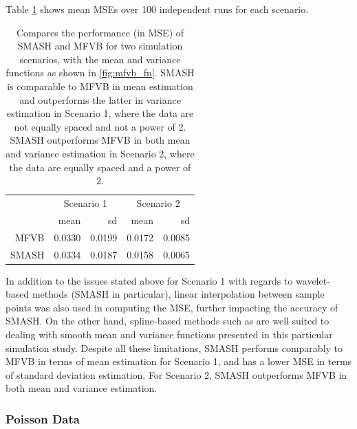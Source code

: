 \documentclass[12pt]{article}
\begin{document}
Table \ref{table:mfvb_comp} shows mean MSEs over 100 independent runs for each scenario.
\begin{table}[ht]
\centering
\begin{tabular}{rrrrr}
\hline
& \multicolumn{2}{c}{Scenario 1}&\multicolumn{2}{c}{Scenario 2}\\
\cline{2-5}
& mean & sd & mean & sd \\
\hline
MFVB & 0.0330 & 0.0199 & 0.0172 & 0.0085 \\
SMASH & 0.0334 & 0.0187 & 0.0158 & 0.0065 \\
\hline
\end{tabular}
\caption{Compares the performance (in MSE) of SMASH and MFVB for two simulation scenarios, with the mean and variance functions as shown in \ref{fig:mfvb_fn}. SMASH is comparable to MFVB in mean estimation and outperforms the latter in variance estimation in Scenario 1, where the data are not equally spaced and not a power of 2. SMASH outperforms MFVB in both mean and variance estimation in Scenario 2, where the data are equally spaced and a power of 2.}
\label{table:mfvb_comp}
\end{table}

In addition to the issues stated above for Scenario 1 with regards to wavelet-based methods (SMASH in particular), linear interpolation between sample points was also used in computing the MSE, further impacting the accuracy of SMASH. On the other hand, spline-based methods such as \cite{Menictas2015Variational} are well suited to dealing with smooth mean and variance functions presented in this particular simulation study. Despite all these limitations, SMASH performs comparably to MFVB in terms of mean estimation for Scenario 1, and has a lower MSE in terms of standard deviation estimation. For Scenario 2, SMASH outperforms MFVB in both mean and variance estimation. 


\subsubsection{Poisson Data}
\end{document}
